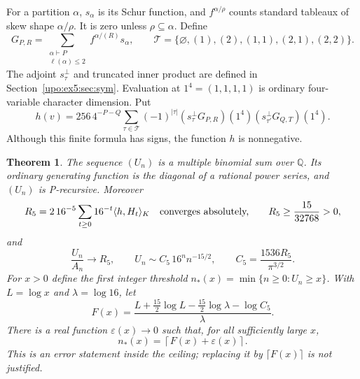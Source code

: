 \documentclass[11pt,letterpaper]{article}
\newtheorem{theorem}{Theorem}[section]
\theoremstyle{remark}\newtheorem{remark}[theorem]{Remark}
\numberwithin{equation}{section}
\newcommand{\pair}[2]{\langle #1,#2\rangle_K}
\newcommand{\Tset}{\mathcal T}
\begin{document}
For a partition $\alpha$, $s_\alpha$ is its Schur function, and
$f^{\alpha/\rho}$ counts standard tableaux of skew shape $\alpha/\rho$.
It is zero unless $\rho\subseteq\alpha$. Define
\begin{equation}\label{upo:ex5:eq:Gdef}
 G_{P,R}=\sum_{\substack{\alpha\vdash P\\\ell(\alpha)\le2}}
          f^{\alpha/(R)}s_\alpha,
 \qquad
 \Tset=\{\varnothing,(1),(2),(1,1),(2,1),(2,2)\}.
\end{equation}
The adjoint $s_\tau^\perp$ and truncated inner product are defined in
Section~\ref{upo:ex5:sec:sym}. Evaluation at $1^4=(1,1,1,1)$ is ordinary
four-variable character dimension. Put
\begin{equation}\label{upo:ex5:eq:hdef}
 h(v)=256\,4^{-P-Q}
 \sum_{\tau\in\Tset}(-1)^{|\tau|}
 (s_\tau^\perp G_{P,R})(1^4)
 (s_{\tau'}^\perp G_{Q,T})(1^4).
\end{equation}
Although this finite formula has signs, the function $h$ is nonnegative.

\begin{theorem}\label{upo:ex5:thm:overview}
The sequence $(U_n)$ is a multiple binomial sum over $\mathbb Q$.
Its ordinary generating function is the diagonal of a rational power
series, and $(U_n)$ is P-recursive. Moreover
\begin{equation}\label{upo:ex5:eq:Rdef}
 R_5=2\,16^{-5}\sum_{t\ge0}16^{-t}\pair h{H_t}
 \quad\hbox{converges absolutely,}\qquad
 R_5\ge\frac{15}{32768}>0,
\end{equation}
and
\begin{equation}\label{upo:ex5:eq:main}
 \frac{U_n}{A_n}\longrightarrow R_5,
 \qquad
 U_n\sim C_5\,16^n n^{-15/2},\qquad
 C_5=\frac{1536R_5}{\pi^{3/2}}.
\end{equation}
For $x>0$ define the first integer threshold
$n_*(x)=\min\{n\ge0:U_n\ge x\}$. With $L=\log x$ and
$\lambda=\log16$, let
\begin{equation}\label{upo:ex5:eq:Fdef}
 F(x)=\frac{L+\tfrac{15}{2}\log L
                  -\tfrac{15}{2}\log\lambda-\log C_5}{\lambda}.
\end{equation}
There is a real function $\varepsilon(x)\to0$ such that, for all
sufficiently large $x$,
\begin{equation}\label{upo:ex5:eq:inverse-main}
 n_*(x)=\left\lceil F(x)+\varepsilon(x)\right\rceil.
\end{equation}
This is an error statement \emph{inside} the ceiling; replacing it by
$\lceil F(x)\rceil$ is not justified.
\end{theorem}
\end{document}
